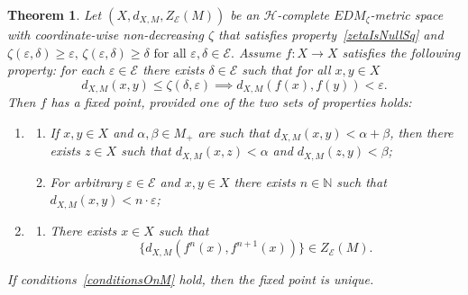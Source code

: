 \documentclass[12pt]{amsart}          %
\newtheorem{theorem}{Theorem}
\newcommand{\NN}{\mathbb N}
\newcommand{\EE}{\mathcal{E}}
\begin{document}
\begin{theorem}\label{th::M-KContraction}
Let $(X,d_{X,M},Z_{\EE}(M))$ be an $\mathcal{H}$-complete $EDM_\zeta$-metric space with coordinate-wise non-decreasing $\zeta$ that satisfies property~\eqref{zetaIsNullSq} and 
$
\zeta(\varepsilon,\delta)\geq \varepsilon,\, \zeta(\varepsilon,\delta)\geq \delta \text{ for all } \varepsilon, \delta\in \EE.
$
Assume $f\colon X\to X$ satisfies the following property: for each $\varepsilon\in \EE$ there exists $\delta\in \EE$ such that for all $x,y\in X$ 
\begin{equation}\label{taylor2}          d_{X,M}(x,y)\leq \zeta( \delta, \varepsilon) \implies d_{X,M}(f(x),f(y))<\varepsilon.
\end{equation}
Then $f$ has a fixed point, provided one of the two sets of properties holds:
\begin{enumerate}[label = \Roman*]
\item\label{conditionsOnM}
\begin{enumerate}
    \item\label{taylorUniqueness1} If $x,y\in X$ and $\alpha, \beta\in M_+$ are such that $d_{X,M}(x,y)< \alpha+\beta$, then there exists $z\in X$ such that $d_{X,M}(x,z) < \alpha$ and $d_{X,M}(z,y) < \beta$;
    \item\label{taylorUniqueness2} For arbitrary $\varepsilon\in \EE$ and $x,y\in X$ there exists $n\in\NN$ such that $d_{X,M}(x,y)< n\cdot \varepsilon$;
\end{enumerate}
\item \label{conditionsOnF}
\begin{enumerate}
    \item  There exists $x\in X$ such that 
\begin{equation}\label{taylor1}
  \{  d_{X,M}(f^n(x),f^{n+1}(x))\}\in Z_{\EE}(M).
\end{equation} 
\end{enumerate}
\end{enumerate}
If conditions~\ref{conditionsOnM} hold, then the fixed point is unique.
\end{theorem}
\end{document}

